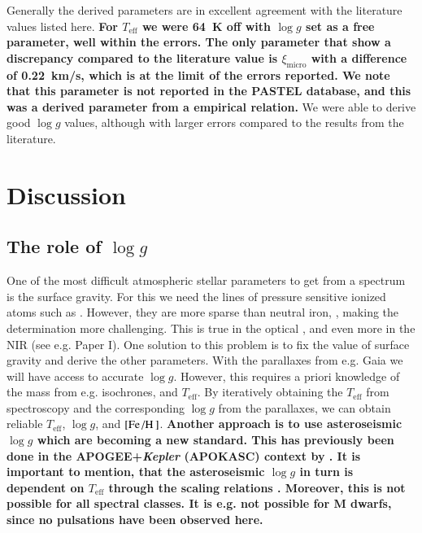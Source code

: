 \documentclass{aa}
\begin{document}
Generally the derived parameters are in excellent agreement with the literature
values listed here. {\bf For $T_\mathrm{eff}$ we were \SI{64}{K} off with $\log
g$ set as a free parameter, well within the errors. The only parameter that show
a discrepancy compared to the literature value is $\xi_\mathrm{micro}$ with a
difference of \SI{0.22}{km/s}, which is at the limit of the errors reported. We
note that this parameter is not reported in the PASTEL database, and this was a
derived parameter from a empirical relation.} We were able to derive good $\log
g$ values, although with larger errors compared to the results from the
literature.



\section{Discussion}
\label{sec:discussion}

\subsection{The role of $\log g$}

One of the most difficult atmospheric stellar parameters to get from a spectrum
is the surface gravity. For this we need the lines of pressure sensitive ionized
atoms such as . However, they are more sparse than neutral iron,
, making the determination more challenging. This is true in the
optical \citep[see e.g. the discussion by][]{Mortier2013c}, and even more in the
NIR (see e.g. Paper I). One solution to this problem is to fix the value of
surface gravity and derive the other parameters. With the parallaxes from e.g.
Gaia \citep{GAIA} we will have access to accurate $\log g$. However, this
requires a priori knowledge of the mass from e.g. isochrones, and
$T_\mathrm{eff}$. By iteratively obtaining the $T_\mathrm{eff}$ from
spectroscopy and the corresponding $\log g$ from the parallaxes, we can obtain
reliable $T_\mathrm{eff}$, $\log g$, and $[\ion{Fe}/\ion{H}]$. {\bf Another
approach is to use asteroseismic $\log g$ which are becoming a new standard.
This has previously been done in the APOGEE+\emph{Kepler} (APOKASC) context by
\citet{Pinsonneault2014,Hawkins2016}. It is important to mention, that the
asteroseismic $\log g$ in turn is dependent on $T_\mathrm{eff}$ through the
scaling relations \citep[see e.g.][]{Kjeldsen1995}. Moreover, this is not
possible for all spectral classes. It is e.g. not possible for M dwarfs, since
no pulsations have been observed here.}
\end{document}
